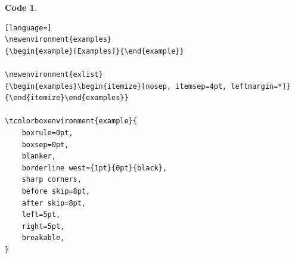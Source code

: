 \documentclass{course}
\theoremstyle{unnumbered}
\newtheorem{code}{Code}
\begin{document}
\begin{code}
\begin{lstlisting}[language=]
\newenvironment{examples}
{\begin{example}[Examples]}{\end{example}}

\newenvironment{exlist}
{\begin{examples}\begin{itemize}[nosep, itemsep=4pt, leftmargin=*]}{\end{itemize}\end{examples}}

\tcolorboxenvironment{example}{
	boxrule=0pt,
	boxsep=0pt,
	blanker,
	borderline west={1pt}{0pt}{black},
	sharp corners,
	before skip=8pt,
	after skip=8pt,
	left=5pt,
	right=5pt,
	breakable,
}
\end{lstlisting}
\end{code}
\end{document}
